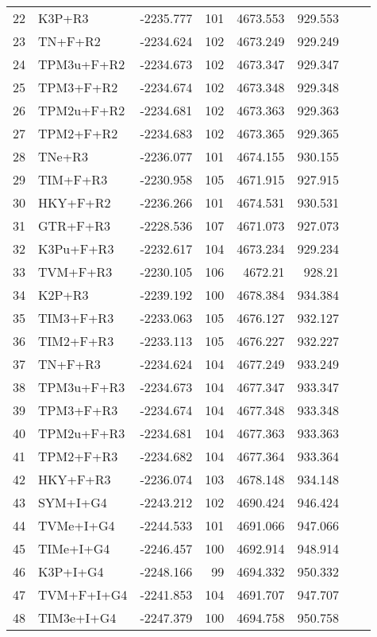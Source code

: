 \begin{longtable}{clrrrrrr}
	22 & K3P+R3 & -2235.777 & 101 & 4673.553 & 929.553 \\ 
	23 & TN+F+R2 & -2234.624 & 102 & 4673.249 & 929.249 \\ 
	24 & TPM3u+F+R2 & -2234.673 & 102 & 4673.347 & 929.347 \\ 
	25 & TPM3+F+R2 & -2234.674 & 102 & 4673.348 & 929.348 \\ 
	26 & TPM2u+F+R2 & -2234.681 & 102 & 4673.363 & 929.363 \\ 
	27 & TPM2+F+R2 & -2234.683 & 102 & 4673.365 & 929.365 \\ 
	28 & TNe+R3 & -2236.077 & 101 & 4674.155 & 930.155 \\ 
	29 & TIM+F+R3 & -2230.958 & 105 & 4671.915 & 927.915 \\ 
	30 & HKY+F+R2 & -2236.266 & 101 & 4674.531 & 930.531 \\ 
	31 & GTR+F+R3 & -2228.536 & 107 & 4671.073 & 927.073 \\ 
	32 & K3Pu+F+R3 & -2232.617 & 104 & 4673.234 & 929.234 \\ 
	33 & TVM+F+R3 & -2230.105 & 106 & 4672.21 & 928.21 \\ 
	34 & K2P+R3 & -2239.192 & 100 & 4678.384 & 934.384 \\ 
	35 & TIM3+F+R3 & -2233.063 & 105 & 4676.127 & 932.127 \\ 
	36 & TIM2+F+R3 & -2233.113 & 105 & 4676.227 & 932.227 \\ 
	37 & TN+F+R3 & -2234.624 & 104 & 4677.249 & 933.249 \\ 
	38 & TPM3u+F+R3 & -2234.673 & 104 & 4677.347 & 933.347 \\ 
	39 & TPM3+F+R3 & -2234.674 & 104 & 4677.348 & 933.348 \\ 
	40 & TPM2u+F+R3 & -2234.681 & 104 & 4677.363 & 933.363 \\ 
	41 & TPM2+F+R3 & -2234.682 & 104 & 4677.364 & 933.364 \\ 
	42 & HKY+F+R3 & -2236.074 & 103 & 4678.148 & 934.148 \\ 
	43 & SYM+I+G4 & -2243.212 & 102 & 4690.424 & 946.424 \\ 
	44 & TVMe+I+G4 & -2244.533 & 101 & 4691.066 & 947.066 \\ 
	45 & TIMe+I+G4 & -2246.457 & 100 & 4692.914 & 948.914 \\ 
	46 & K3P+I+G4 & -2248.166 & 99 & 4694.332 & 950.332 \\ 
	47 & TVM+F+I+G4 & -2241.853 & 104 & 4691.707 & 947.707 \\ 
	48 & TIM3e+I+G4 & -2247.379 & 100 & 4694.758 & 950.758 \\ 

\end{longtable}
